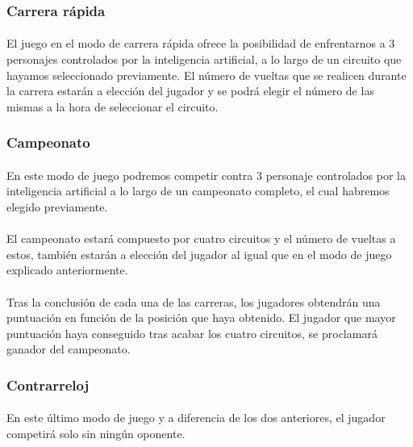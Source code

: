 \subsubsection{Carrera rápida} 

\paragraph{}
El juego en el modo de carrera rápida ofrece la posibilidad de enfrentarnos a 3 personajes 
controlados por la inteligencia artificial, a lo largo de un circuito que
hayamos seleccionado previamente. El número de vueltas
que se realicen durante la carrera estarán a elección del jugador y se podrá elegir el número de las mismas a la hora de seleccionar
el circuito.

\subsubsection{Campeonato} 

\paragraph{}
En este modo de juego podremos competir contra 3 personaje controlados por la inteligencia artificial 
a lo largo de un campeonato completo, el cual habremos elegido previamente. 

\paragraph{}
El campeonato estará compuesto por cuatro circuitos y el número de vueltas a estos, también estarán a elección del jugador 
al igual que en el modo de juego explicado anteriormente.

\paragraph{}
Tras la conclusión de cada una de las carreras, los jugadores obtendrán una puntuación en función de la posición que haya 
obtenido. El jugador que mayor puntuación haya conseguido tras acabar los cuatro circuitos, se proclamará ganador del 
campeonato.

\subsubsection{Contrarreloj} 

\paragraph{}
En este último modo de juego y a diferencia de los dos anteriores, el jugador competirá solo sin ningún oponente.

